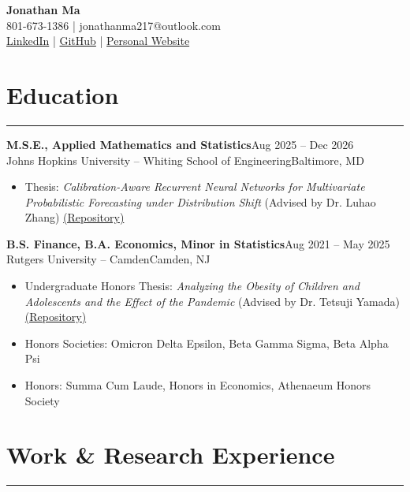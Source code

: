 \documentclass[11pt]{article}
\newcommand{\resheading}[1]{%
  \Needspace{6\baselineskip}%
  \section*{#1}\vspace{-4pt}\color{rulegray}\hrule\vspace{4pt}\color{black}
}
\newcommand{\entry}[4]{%
  \Needspace{6\baselineskip}%
  \textbf{#1}\hfill #2\\[-1pt]%
  #3\hfill #4\\[-8pt]%
}
\newenvironment{tightitemize}{%
  \vspace{-2pt}%
  \begin{itemize}[leftmargin=*,topsep=0pt,itemsep=1pt,parsep=0pt,partopsep=0pt]
}{%
  \end{itemize}\vspace{4pt}
}
\begin{document}
\begin{center}
{\Large \textbf{Jonathan Ma}}\\
801-673-1386 | jonathanma217@outlook.com \\
\href{https://www.linkedin.com/in/jonathanma217/}{LinkedIn} | \href{https://github.com/JonathanMa03}{GitHub} | \href{https://jonathanma03.github.io/}{Personal Website}
\end{center}


\resheading{Education}

\entry
{M.S.E., Applied Mathematics and Statistics}
{Aug 2025 -- Dec 2026}
{Johns Hopkins University -- Whiting School of Engineering}
{Baltimore, MD}
\begin{tightitemize}
\item Thesis: \textit{Calibration-Aware Recurrent Neural Networks for Multivariate Probabilistic Forecasting under Distribution Shift} (Advised by Dr. Luhao Zhang) \href{https://github.com/JonathanMa03/innovative-droBVAR}{(Repository)}
\end{tightitemize}

\entry
{B.S. Finance, B.A. Economics, Minor in Statistics}
{Aug 2021 -- May 2025}
{Rutgers University -- Camden}
{Camden, NJ}
\begin{tightitemize}
\item Undergraduate Honors Thesis: \textit{Analyzing the Obesity of Children and Adolescents and the Effect of the Pandemic} (Advised by Dr. Tetsuji Yamada) \href{https://github.com/JonathanMa03/YouthObesity}{(Repository)}
\item Honors Societies: Omicron Delta Epsilon, Beta Gamma Sigma, Beta Alpha Psi
\item Honors: Summa Cum Laude, Honors in Economics, Athenaeum Honors Society
\end{tightitemize}

\resheading{Work \& Research Experience}
\end{document}
